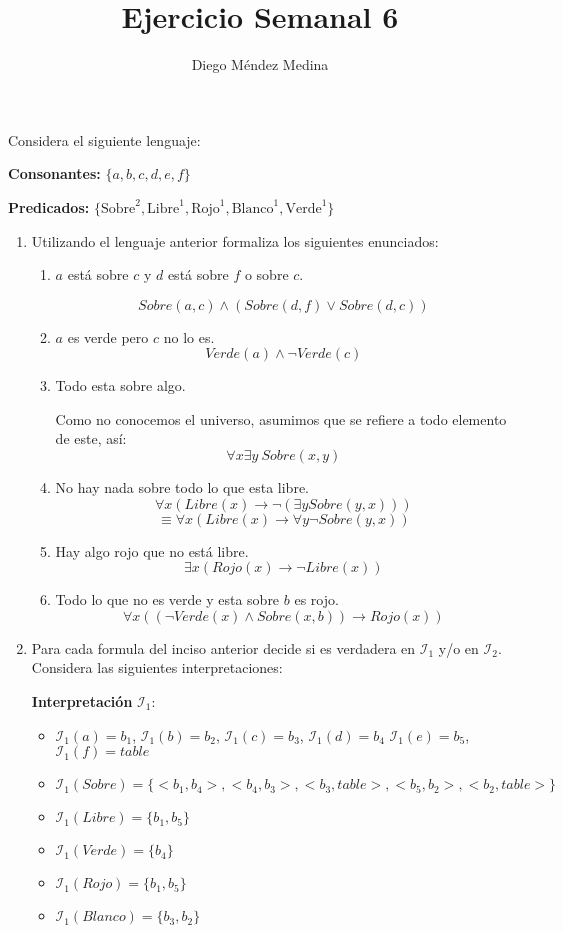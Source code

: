 \documentclass[8pt, letterpaper]{article}
\title{%
  Ejercicio Semanal 6\\
  {\large{}}}
\author{Diego Méndez Medina}
\date{}
\begin{document}
\ttfamily
\maketitle
\rmfamily
Considera el siguiente lenguaje:

\hfill\break
{\bf Consonantes:} $\{a, b, c, d, e, f\}$

\hfill\break
{\bf Predicados:} $\{\text{Sobre}^2, \text{Libre}^1, \text{Rojo}^1,
\text{Blanco}^1, \text{Verde}^1\}$

\begin{enumerate}
\item Utilizando el lenguaje anterior formaliza los siguientes enunciados:
  \begin{enumerate}
  \item $a$ está sobre $c$ y $d$ está sobre $f$ o sobre $c$.

    $$Sobre(a, c) \land (Sobre(d, f) \lor Sobre(d, c))$$
  \item $a$ es verde pero $c$ no lo es.
    $$Verde(a) \land \neg Verde(c)$$
  \item Todo esta sobre algo.
    
    Como no conocemos el universo, asumimos que se refiere a todo elemento
    de este, así:
    $$\forall x \exists y\ Sobre(x,y)$$
  \item No hay nada sobre todo lo que esta libre.
    $$\forall x (Libre(x)\rightarrow \neg(\exists y Sobre(y,x)))$$
    $$\equiv \forall x (Libre(x)\rightarrow \forall y \neg Sobre(y,x))$$
  \item Hay algo rojo que no está libre.
    $$\exists x(Rojo(x) \rightarrow \neg Libre(x))$$
  \item Todo lo que no es verde y esta sobre $b$ es rojo.
    $$\forall x((\neg Verde(x) \land Sobre(x, b)) \rightarrow Rojo(x))$$
  \end{enumerate}
  \newpage
\item Para cada formula del inciso anterior decide si es verdadera en
  $\mathcal{I}_1$ y/o en $\mathcal{I}_2$. Considera las siguientes
  interpretaciones:
  
  {\bf Interpretación} $\mathcal{I}_1:$
  \begin{itemize}
  \item $\mathcal{I}_1(a) = b_1$, $\mathcal{I}_1(b) = b_2$,
    $\mathcal{I}_1(c) = b_3$, $\mathcal{I}_1(d) = b_4$
    $\mathcal{I}_1(e) = b_5$, $\mathcal{I}_1(f) = table$
  \item $\mathcal{I}_1(Sobre) = \{<b_1, b_4>, <b_4, b_3>, <b_3, table>,
    <b_5, b_2>, <b_2, table>\}$
  \item $\mathcal{I}_1(Libre) = \{b_1, b_5\}$
  \item $\mathcal{I}_1(Verde) = \{b_4\}$
  \item $\mathcal{I}_1(Rojo) = \{b_1, b_5\}$
  \item $\mathcal{I}_1(Blanco) = \{b_3, b_2\}$
  \end{itemize}


\end{enumerate}
\end{document}
